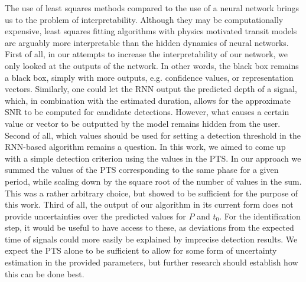 The use of least squares methods compared to the use of a neural network brings us to the problem of interpretability. Although they may be computationally expensive, least squares fitting algorithms with physics motivated transit models are arguably more interpretable than the hidden dynamics of neural networks. First of all, in our attempts to increase the interpretability of our network, we only looked at the outputs of the network. In other words, the black box remains a black box, simply with more outputs, e.g. confidence values, or representation vectors. Similarly, one could let the RNN output the predicted depth of a signal, which, in combination with the estimated duration, allows for the approximate SNR to be computed for candidate detections. However, what causes a certain value or vector to be outputted by the model remains hidden from the user. Second of all, which values should be used for setting a detection threshold in the RNN-based algorithm remains a question. In this work, we aimed to come up with a simple detection criterion using the values in the PTS. In our approach we summed the values of the PTS corresponding to the same phase for a given period, while scaling down by the square root of the number of values in the sum. This was a rather arbitrary choice, but showed to be sufficient for the purpose of this work.  Third of all, the output of our algorithm in its current form does not provide uncertainties over the predicted values for $P$ and $t_0$. For the identification step, it would be useful to have access to these, as deviations from the expected time of signals could more easily be explained by imprecise detection results. We expect the PTS alone to be sufficient to allow for some form of uncertainty estimation in the provided parameters, but further research should establish how this can be done best.